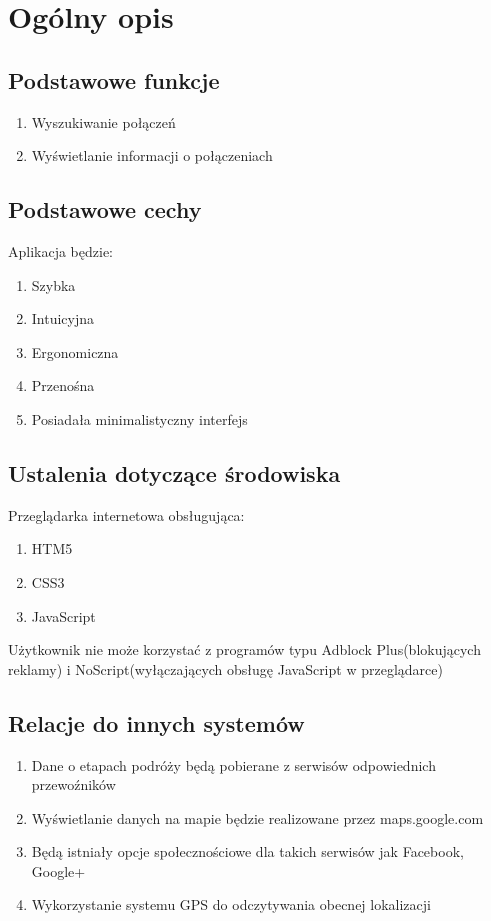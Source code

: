\documentclass[12pt,a4paper]{report}
\begin{document}
\section{Ogólny opis}
\subsection{Podstawowe funkcje}
\begin{enumerate}
	\item  Wyszukiwanie połączeń
	\item  Wyświetlanie informacji o połączeniach
\end{enumerate}
\subsection{Podstawowe cechy}
	Aplikacja będzie:
	\begin{enumerate}
		\item Szybka
		\item Intuicyjna
		\item Ergonomiczna
		\item Przenośna
		\item Posiadała minimalistyczny interfejs
	\end{enumerate}
\subsection{Ustalenia dotyczące środowiska}
	Przeglądarka internetowa obsługująca:
	\begin{enumerate}
		\item HTM5
		\item CSS3
		\item JavaScript
	\end{enumerate}
	Użytkownik nie może korzystać z programów typu Adblock Plus(blokujących reklamy) i NoScript(wyłączających obsługę JavaScript w przeglądarce)
\subsection{Relacje do innych systemów}
\begin{enumerate}
	\item Dane o etapach podróży będą pobierane z serwisów odpowiednich przewoźników
	\item Wyświetlanie danych na mapie będzie realizowane przez maps.google.com
	\item Będą istniały opcje społecznościowe dla takich serwisów jak Facebook, Google+
	\item Wykorzystanie systemu GPS do odczytywania obecnej lokalizacji
\end{enumerate}
\end{document}
